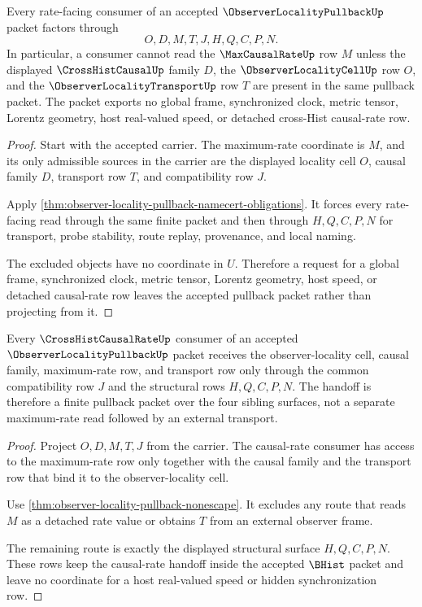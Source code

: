\begin{theorem}
\label{thm:observer-locality-pullback-nonescape}
Every rate-facing consumer of an accepted $\ObserverLocalityPullbackUp$ packet factors through
$$
O,D,M,T,J,H,Q,C,P,N.
$$
In particular, a consumer cannot read the $\MaxCausalRateUp$ row $M$ unless the displayed $\CrossHistCausalUp$ family $D$, the $\ObserverLocalityCellUp$ row $O$, and the $\ObserverLocalityTransportUp$ row $T$ are present in the same pullback packet. The packet exports no global frame, synchronized clock, metric tensor, Lorentz geometry, host real-valued speed, or detached cross-Hist causal-rate row.
\end{theorem}
\begin{proof}
Start with the accepted carrier. The maximum-rate coordinate is $M$, and its only admissible sources in the carrier are the displayed locality cell $O$, causal family $D$, transport row $T$, and compatibility row $J$.

Apply \autoref{thm:observer-locality-pullback-namecert-obligations}. It forces every rate-facing read through the same finite packet and then through $H,Q,C,P,N$ for transport, probe stability, route replay, provenance, and local naming.

The excluded objects have no coordinate in $U$. Therefore a request for a global frame, synchronized clock, metric tensor, Lorentz geometry, host speed, or detached causal-rate row leaves the accepted pullback packet rather than projecting from it.
\end{proof}

\begin{theorem}
\label{thm:observer-locality-pullback-causal-rate-handoff}
Every $\CrossHistCausalRateUp$ consumer of an accepted $\ObserverLocalityPullbackUp$ packet receives the observer-locality cell, causal family, maximum-rate row, and transport row only through the common compatibility row $J$ and the structural rows $H,Q,C,P,N$. The handoff is therefore a finite pullback packet over the four sibling surfaces, not a separate maximum-rate read followed by an external transport.
\end{theorem}
\begin{proof}
Project $O,D,M,T,J$ from the carrier. The causal-rate consumer has access to the maximum-rate row only together with the causal family and the transport row that bind it to the observer-locality cell.

Use \autoref{thm:observer-locality-pullback-nonescape}. It excludes any route that reads $M$ as a detached rate value or obtains $T$ from an external observer frame.

The remaining route is exactly the displayed structural surface $H,Q,C,P,N$. These rows keep the causal-rate handoff inside the accepted $\BHist$ packet and leave no coordinate for a host real-valued speed or hidden synchronization row.
\end{proof}

